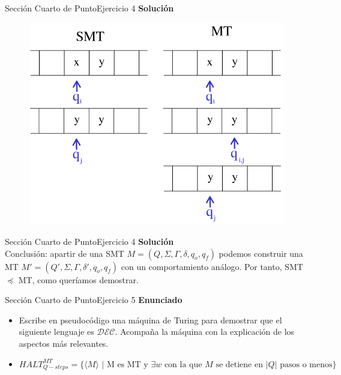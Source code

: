 \documentclass[10pt, envcountsect, presentation, aspectratio=169]{beamer}
\newcommand{\ld}{\ensuremath{\mathcal {DEC}}}
\begin{document}
\begin{frame}{Sección Cuarto de Punto}{Ejercicio 4}
    \textbf{Solución}\\
    \begin{figure}
        \includegraphics[scale=0.25]{images/mct1ej4_3.png}
    \end{figure}
\end{frame}


\begin{frame}{Sección Cuarto de Punto}{Ejercicio 4}
    \textbf{Solución}\\
    Conclusión: apartir de una SMT $M=(Q,\Sigma,\Gamma,\delta,q_o,q_f)$ podemos construir una MT $M'=(Q',\Sigma,\Gamma,\delta',q_o,q_f)$ con un comportamiento análogo.
    Por tanto, SMT $\preceq$ MT, como queríamos demostrar.
\end{frame}


\begin{frame}{Sección Cuarto de Punto}{Ejercicio 5}
\textbf{Enunciado}
	\begin{itemize}
        \item Escribe en pseudocódigo una máquina de Turing para demostrar que el siguiente lenguaje es $\ld$. Acompaña la máquina con la explicación de los aspectos más relevantes. 
        \item[] $$HALT_{Q-steps}^{MT}=\{\langle M \rangle \mbox{ | M es MT y } \exists w \mbox{ con la que } M \mbox{ se detiene en }|Q| \mbox{ pasos o menos}  \}$$
    \end{itemize}
\end{frame}
\end{document}
